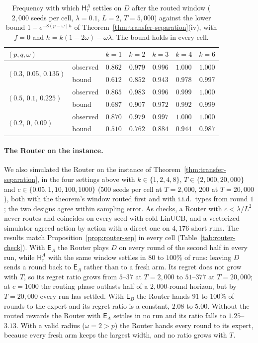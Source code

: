 \documentclass[anon]{alt2027} %
\newcommand{\Exp}{\mathsf{E}}
\newcommand{\Hyb}{\mathsf{H}}
\begin{document}
\begin{table}[ht]
\centering
\caption{Frequency with which $\Hyb^A_\tau$ settles on $D$ after the routed
window ($2{,}000$ seeds per cell, $\lambda=0.1$, $L=2$, $T=5{,}000$) against the
lower bound $1-e^{-8(p-\omega)h}$ of Theorem~\ref{thm:transfer-separation}(iv),
with $f=0$ and $h=k(1-2\omega)-\omega\lambda$. The bound holds in every cell.}
\label{tab:transfer-check}
\small
\begin{tabular}{@{}llccccc@{}}
\toprule
$(p,q,\omega)$ & & $k=1$ & $k=2$ & $k=3$ & $k=4$ & $k=6$ \\
\midrule
\multirow{2}{*}{$(0.3,\,0.05,\,0.135)$} & observed & $0.862$ & $0.979$ & $0.996$ & $1.000$ & $1.000$ \\
 & bound & $0.612$ & $0.852$ & $0.943$ & $0.978$ & $0.997$ \\
\midrule
\multirow{2}{*}{$(0.5,\,0.1,\,0.225)$} & observed & $0.865$ & $0.983$ & $0.996$ & $0.999$ & $1.000$ \\
 & bound & $0.687$ & $0.907$ & $0.972$ & $0.992$ & $0.999$ \\
\midrule
\multirow{2}{*}{$(0.2,\,0,\,0.09)$} & observed & $0.870$ & $0.979$ & $0.997$ & $1.000$ & $1.000$ \\
 & bound & $0.510$ & $0.762$ & $0.884$ & $0.944$ & $0.987$ \\
\bottomrule
\end{tabular}
\end{table}

\paragraph{The Router on the instance.}
\label{app:router-sim}
We also simulated the Router on the instance of
Theorem~\ref{thm:transfer-separation}, in the four settings above with
$k\in\{1,2,4,8\}$, $T\in\{2{,}000,20{,}000\}$ and
$c\in\{0.05,1,10,100,1000\}$ ($500$ seeds per cell at $T=2{,}000$, $200$ at
$T=20{,}000$), both with the theorem's window routed first and with i.i.d.\
types from round $1$; the two designs agree within sampling error. As checks,
a Router with $c<\lambda/L^2$ never routes and coincides on every seed with cold
LinUCB, and a vectorized simulator agreed action by action with a direct one
on $4{,}176$ short runs. The results match Proposition~\ref{prop:router-sep}
in every cell (Table~\ref{tab:router-check}). With $\Exp_A$ the Router plays
$D$ on every round of the second half in every run, while $\Hyb^A_\tau$ with
the same window settles in $80$ to $100\%$ of runs: leaving $D$ sends a round
back to $\Exp_A$ rather than to a fresh arm. Its regret does not grow with
$T$, so its regret ratio grows from $5$--$37$ at $T=2{,}000$ to $51$--$377$ at
$T=20{,}000$; at $c=1000$ the routing phase outlasts half of a $2{,}000$-round
horizon, but by $T=20{,}000$ every run has settled. With $\Exp_B$ the Router
hands $91$ to $100\%$ of rounds to the expert and its regret ratio is a
constant, $2.08$ to $5.00$. Without the routed rewards the Router with
$\Exp_A$ settles in no run and its ratio falls to $1.25$--$3.13$. With a valid
radius ($\omega=2>p$) the Router hands every round to its expert, because
every fresh arm keeps the largest width, and no ratio grows with $T$.
\end{document}
